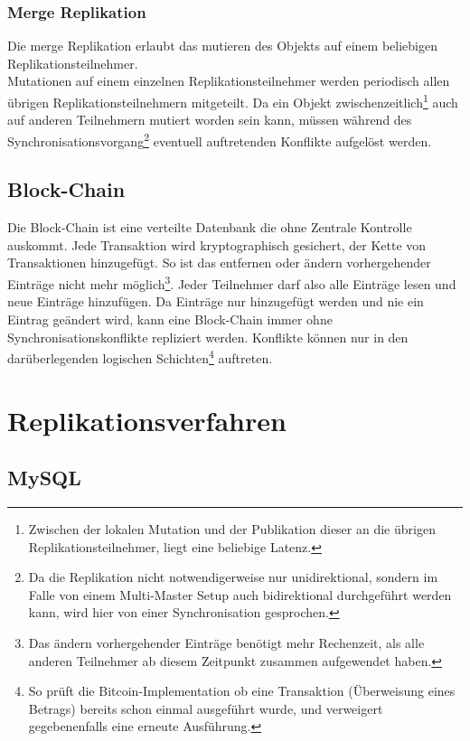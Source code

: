 \documentclass[oneside,11pt,parskip=half,ngerman]{scrreprt}
\begin{document}
\subsubsection{Merge Replikation}\label{merge-replikation}

Die merge Replikation erlaubt das mutieren des Objekts auf einem
beliebigen Replikationsteilnehmer.\\Mutationen auf einem einzelnen
Replikationsteilnehmer werden periodisch allen übrigen
Replikationsteilnehmern mitgeteilt. Da ein Objekt
zwischenzeitlich\footnote{Zwischen der lokalen Mutation und der
  Publikation dieser an die übrigen Replikationsteilnehmer, liegt eine
  beliebige Latenz.} auch auf anderen Teilnehmern mutiert worden sein
kann, müssen während des Synchronisationsvorgang\footnote{Da die
  Replikation nicht notwendigerweise nur unidirektional, sondern im
  Falle von einem Multi-Master Setup auch bidirektional durchgeführt
  werden kann, wird hier von einer Synchronisation gesprochen.}
eventuell auftretenden Konflikte aufgelöst werden.

\subsection{Block-Chain}\label{block-chain}

Die Block-Chain ist eine verteilte Datenbank die ohne Zentrale Kontrolle
auskommt. Jede Transaktion wird kryptographisch gesichert, der Kette von
Transaktionen hinzugefügt. So ist das entfernen oder ändern
vorhergehender Einträge nicht mehr möglich\footnote{Das ändern
  vorhergehender Einträge benötigt mehr Rechenzeit, als alle anderen
  Teilnehmer ab diesem Zeitpunkt zusammen aufgewendet haben.}. Jeder
Teilnehmer darf also alle Einträge lesen und neue Einträge hinzufügen.
Da Einträge nur hinzugefügt werden und nie ein Eintrag geändert wird,
kann eine Block-Chain immer ohne Synchronisationskonflikte repliziert
werden. Konflikte können nur in den darüberlegenden logischen
Schichten\footnote{So prüft die Bitcoin-Implementation ob eine
  Transaktion (Überweisung eines Betrags) bereits schon einmal
  ausgeführt wurde, und verweigert gegebenenfalls eine erneute
  Ausführung.} auftreten. \autocite{block-chain}

\section{Replikationsverfahren}\label{replikationsverfahren}

\subsection{MySQL}\label{mysql}
\end{document}
